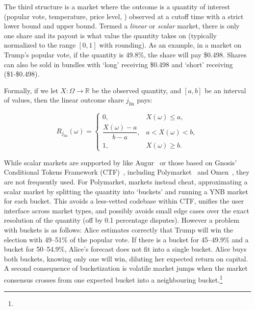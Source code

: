 The third structure is a market where the outcome is a quantity of interest (\eg popular vote, temperature, price level, \etc) observed at a cutoff time with a strict lower bound and upper bound. Termed a \textit{linear} or \textit{scalar} market, there is only one share and its payout is what value the quantity takes on (typically normalized to the range $[0,1]$ with rounding). As an example, in a market on Trump's popular vote, if the quantity is 49.8\%, the share will pay \$0.498. Shares can also be sold in bundles with `long' receiving \$0.498 and `short' receiving (\$1-\$0.498).

Formally, if we let $X:\Omega\to\mathbb{R}$ be the observed quantity, and $[a,b]$ be an interval of values, then the linear outcome share $j_{\mathrm{lin}}$ pays:

\begin{equation}
R_{j_{\mathrm{lin}}}(\omega)=
\begin{cases}
0, & X(\omega)\le a,\\
\dfrac{X(\omega)-a}{\,b-a\,}, & a< X(\omega) < b,\\
1, & X(\omega)\ge b.
\end{cases}
\end{equation}


While scalar markets are supported by \depms like Augur~\cite{AKPWZ15,AKPWZ19} or those based on Gnosis' Conditional Tokens Framework (CTF)~\cite{ctf}, including Polymarket~\cite{poly} and Omen~\cite{Omen_docs}, they are not frequently used. For Polymarket, markets instead cheat, approximating a scalar market  by splitting the quantity into `buckets' and running a YNB market for each bucket. This avoids a less-vetted codebase within CTF, unifies the user interface across market types, and possibly avoids small edge cases over the exact resolution of the quantity (\eg off by 0.1 percentage disputes). However a problem with buckets is as follows: Alice estimates correctly that Trump will win the election with 49--51\% of the popular vote. If there is a bucket for 45--49.9\% and a bucket for 50--54.9\%, Alice's forecast does not fit into a single bucket. Alice buys both buckets, knowing only one will win, diluting her expected return on capital. A second consequence of bucketization is volatile market jumps when the market consensus crosses from one expected bucket into a neighbouring bucket.\footnote{} 


